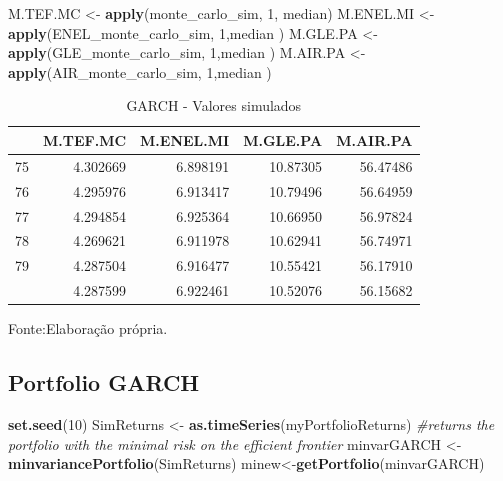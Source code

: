 \documentclass[
  12pt,
  a4paper,
  openany]{book}
\newenvironment{Shaded}{\begin{snugshade}}{\end{snugshade}}
\newcommand{\CommentTok}[1]{\textcolor[rgb]{0.56,0.35,0.01}{\textit{#1}}}
\newcommand{\DecValTok}[1]{\textcolor[rgb]{0.00,0.00,0.81}{#1}}
\newcommand{\KeywordTok}[1]{\textcolor[rgb]{0.13,0.29,0.53}{\textbf{#1}}}
\newcommand{\NormalTok}[1]{#1}
\newcommand{\StringTok}[1]{\textcolor[rgb]{0.31,0.60,0.02}{#1}}
\begin{document}
\scriptsize

\begin{Shaded}
\begin{Highlighting}[]
\NormalTok{M.TEF.MC \textless{}{-}}\StringTok{ }\KeywordTok{apply}\NormalTok{(monte\_carlo\_sim, }\DecValTok{1}\NormalTok{, median)}
\NormalTok{M.ENEL.MI \textless{}{-}}\StringTok{ }\KeywordTok{apply}\NormalTok{(ENEL\_monte\_carlo\_sim, }\DecValTok{1}\NormalTok{,median )}
\NormalTok{M.GLE.PA \textless{}{-}}\StringTok{ }\KeywordTok{apply}\NormalTok{(GLE\_monte\_carlo\_sim, }\DecValTok{1}\NormalTok{,median )}
\NormalTok{M.AIR.PA \textless{}{-}}\StringTok{ }\KeywordTok{apply}\NormalTok{(AIR\_monte\_carlo\_sim, }\DecValTok{1}\NormalTok{,median )}
\end{Highlighting}
\end{Shaded}

\normalsize
\begin{table}[!h]

\caption{\label{tab:unnamed-chunk-50}GARCH - Valores simulados}
\centering
\begin{tabular}[t]{lrrrr}
\toprule
  & M.TEF.MC & M.ENEL.MI & M.GLE.PA & M.AIR.PA\\
\midrule
75 & 4.302669 & 6.898191 & 10.87305 & 56.47486\\
76 & 4.295976 & 6.913417 & 10.79496 & 56.64959\\
77 & 4.294854 & 6.925364 & 10.66950 & 56.97824\\
78 & 4.269621 & 6.911978 & 10.62941 & 56.74971\\
79 & 4.287504 & 6.916477 & 10.55421 & 56.17910\\
\addlinespace
80 & 4.287599 & 6.922461 & 10.52076 & 56.15682\\
\bottomrule
\end{tabular}
\end{table}
\FloatBarrier
\centering

Fonte:Elaboração própria.

\justifying
\bigskip

\hypertarget{portfolio-garch}{%
\subsection{Portfolio GARCH}\label{portfolio-garch}}

\scriptsize

\begin{Shaded}
\begin{Highlighting}[]
\KeywordTok{set.seed}\NormalTok{(}\DecValTok{10}\NormalTok{)}
\NormalTok{SimReturns \textless{}{-}}\StringTok{ }\KeywordTok{as.timeSeries}\NormalTok{(myPortfolioReturns)}
\CommentTok{\#returns the portfolio with the minimal risk on the efficient frontier}
\NormalTok{minvarGARCH \textless{}{-}}\StringTok{ }\KeywordTok{minvariancePortfolio}\NormalTok{(SimReturns) }
\NormalTok{minew\textless{}{-}}\KeywordTok{getPortfolio}\NormalTok{(minvarGARCH)}
\end{Highlighting}
\end{Shaded}
\end{document}
